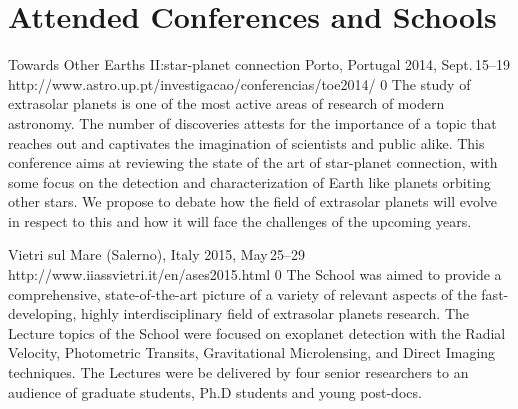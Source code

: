 \section{Attended Conferences and Schools}\label{appsec:conferences}

{Towards Other Earths II:\@The star-planet connection}%
{Porto, Portugal}%
{2014, Sept.\,15--19}%
{http://www.astro.up.pt/investigacao/conferencias/toe2014/}%
{0}%
{The study of extrasolar planets is one of the most active areas of research of modern astronomy.
The number of discoveries attests for the importance of a topic that reaches out and captivates the imagination of scientists and public alike.
This conference aims at reviewing the state of the art of star-planet connection, with some focus on the detection and characterization of Earth like planets orbiting other stars.
We propose to debate how the field of extrasolar planets will evolve in respect to this and how it will face the challenges of the upcoming years.}%

{Vietri sul Mare (Salerno), Italy}%
{2015, May\,25--29}%
{http://www.iiassvietri.it/en/ases2015.html}%
{0}%
{The School was aimed to provide a comprehensive, state-of-the-art picture of a variety of relevant aspects of the fast-developing, highly interdisciplinary field of extrasolar planets research.
The Lecture topics of the School were focused on exoplanet detection with the Radial Velocity, Photometric Transits, Gravitational Microlensing, and Direct Imaging techniques.
The Lectures were be delivered by four senior researchers to an audience of graduate students, Ph.D students and young post-docs.}%

